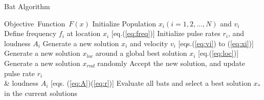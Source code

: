 \documentclass{ies2018}
\begin{document}
\begin{algorithm}[H]
\caption{Bat Algorithm}
\label{code:ba}
\begin{algorithmic}[1]
\REQUIRE Objective\ Function\ $F(x)$
\STATE Initialize Population $x_i(i=1,2,..., N)$ and $v_i$\\
\STATE Define frequency $f_i$ at location $x_i$ [eq.(\ref{eq:freq})]
\STATE Initialize pulse rates $r_i$, and loudness $A_i$
\STATE Generate a new solution $x_i$ and velocity $v_i$ [eqs.(\ref{eq:vi}) to (\ref{eq:xi})]
\STATE Generate a new solution $x_{loc}$ around a global best solution $x_i$ [eq.(\ref{eq:loc})] 
\ENDIF
\STATE Generate a new solution $x_{rnd}$ randomly
\STATE Accept the new solution, and update pulse rate $r_i$ \\ \& loudness $A_i$ [eqs. (\ref{eq:A})(\ref{eq:r})]  
\ENDIF
\STATE Evaluate all bats and select a best solution $x_*$ in the current solutions
\ENDFOR
\ENDWHILE
\end{algorithmic}
\end{algorithm}


\end{document}
